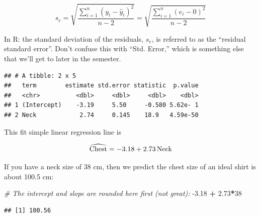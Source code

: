 \documentclass[
]{book}
\newenvironment{Shaded}{\begin{snugshade}}{\end{snugshade}}
\newcommand{\CommentTok}[1]{\textcolor[rgb]{0.56,0.35,0.01}{\textit{#1}}}
\newcommand{\DataTypeTok}[1]{\textcolor[rgb]{0.13,0.29,0.53}{#1}}
\newcommand{\DecValTok}[1]{\textcolor[rgb]{0.00,0.00,0.81}{#1}}
\newcommand{\FloatTok}[1]{\textcolor[rgb]{0.00,0.00,0.81}{#1}}
\newcommand{\KeywordTok}[1]{\textcolor[rgb]{0.13,0.29,0.53}{\textbf{#1}}}
\newcommand{\NormalTok}[1]{#1}
\newcommand{\OperatorTok}[1]{\textcolor[rgb]{0.81,0.36,0.00}{\textbf{#1}}}
\newcommand{\StringTok}[1]{\textcolor[rgb]{0.31,0.60,0.02}{#1}}
\begin{document}
\[s_e = \sqrt{\frac{\sum^n_{i=1} (y_i-\hat{y}_i)^2}{n-2}}  = \sqrt{\frac{\sum^n_{i=1} (e_i-0)^2}{n-2}} \]

In R: the standard deviation of the residuals, \(s_e\), is referred to as the ``residual standard error''. Don't confuse this with ``Std. Error,'' which is something else that we'll get to later in the semester.

\begin{Shaded}
\end{Shaded}

\begin{verbatim}
## # A tibble: 2 x 5
##   term        estimate std.error statistic  p.value
##   <chr>          <dbl>     <dbl>     <dbl>    <dbl>
## 1 (Intercept)    -3.19     5.50     -0.580 5.62e- 1
## 2 Neck            2.74     0.145    18.9   4.59e-50
\end{verbatim}

This fit simple linear regression line is

\[ \widehat{\hbox{Chest}} = -3.18 + 2.73\,\hbox{Neck}\]

If you have a neck size of 38 cm, then we predict the chest size of an ideal shirt is about 100.5 cm:

\begin{Shaded}
\begin{Highlighting}[]
\CommentTok{# The intercept and slope are rounded here first (not great):}
\FloatTok{-3.18} \OperatorTok{+}\StringTok{ }\FloatTok{2.73}\OperatorTok{*}\DecValTok{38}
\end{Highlighting}
\end{Shaded}

\begin{verbatim}
## [1] 100.56
\end{verbatim}

\begin{Shaded}
\end{Shaded}
\end{document}
